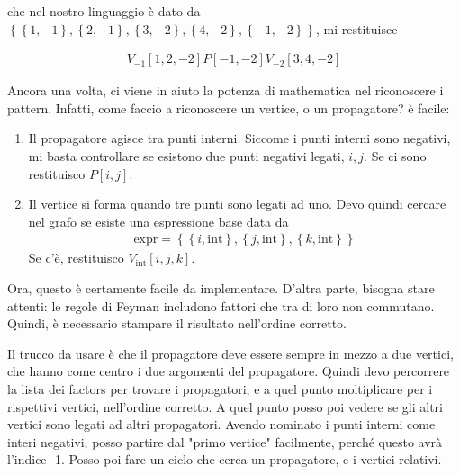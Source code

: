 \documentclass{report}
\begin{document}
che nel nostro linguaggio è dato da \(\left\{ \left\{1, -1 \right\}, \left\{2, -1 \right\}, \left\{3, -2 \right\}, \left\{4, -2 \right\}, \left\{-1, -2 \right\} \right\}\), mi restituisce 

\begin{align}
    V_{-1}[1, 2, -2]P[-1, -2]V_{-2}[3, 4, -2]
\end{align}

Ancora una volta, ci viene in aiuto la potenza di mathematica nel riconoscere i pattern. Infatti, come faccio a riconoscere un vertice, o un propagatore? è facile: 

\begin{enumerate}
    \item Il propagatore agisce tra punti interni. Siccome i punti interni sono negativi, mi basta controllare se esistono due punti negativi legati, \(i,j\). Se ci sono restituisco \(P[i,j]\).  
    \item Il vertice si forma quando tre punti sono legati ad uno. Devo quindi cercare nel grafo se esiste una espressione base data da 
    \begin{align}
        \text{expr} = \left\{\left\{i, \text{int} \right\}, \left\{j, \text{int} \right\}, \left\{k, \text{int} \right\} \right\}
    \end{align}
    Se c'è, restituisco \(V_{\text{int}}[i,j,k]\).
\end{enumerate}

Ora, questo è certamente facile da implementare. D'altra parte, bisogna stare attenti: le regole di Feyman includono fattori che tra di loro non commutano. Quindi, è necessario stampare il risultato nell'ordine corretto. 


Il trucco da usare è che il propagatore deve essere sempre in mezzo a due vertici, che hanno come centro i due argomenti del propagatore. Quindi devo percorrere la lista dei factors per trovare i propagatori, e a quel punto moltiplicare per i rispettivi vertici, nell'ordine corretto. A quel punto posso poi vedere se gli altri vertici sono legati ad altri propagatori. Avendo nominato i punti interni come interi negativi, posso partire dal "primo vertice" facilmente, perché questo avrà l'indice -1. Posso poi fare un ciclo che cerca un propagatore, e i vertici relativi. 
\end{document}
